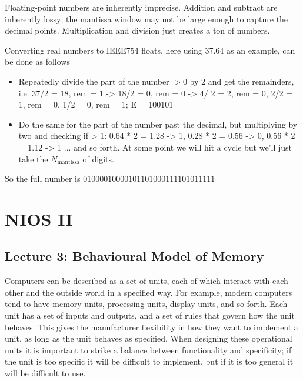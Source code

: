 \documentclass[10pt]{article}
\begin{document}
\begin{definition}
	Floating-point numbers are inherently imprecise. Addition and subtract are inherently lossy; the mantissa window may not be large enough to capture the decimal points. Multiplication and division just creates a ton of numbers.

	Converting real numbers to IEEE754 floats, here using 37.64 as an example, can be done as follows
	\begin{itemize}
		\item Repeatedly divide the part of the number $ >0 $ by $ 2 $ and get the remainders, i.e. 37/2 = 18, rem = 1 -> 18/2 = 0, rem = 0 -> 4/ 2 = 2, rem = 0, 2/2 = 1, rem = 0, 1/2 = 0, rem = 1; E = 100101
		\item Do the same for the part of the number past the decimal, but multiplying by two and checking if > 1: 0.64 * 2 = 1.28 -> 1, 0.28 * 2 = 0.56 -> 0, 0.56 * 2 = 1.12 -> 1 ... and so forth. At some point we will hit a cycle but we'll just take the $ N_{\text{mantissa}} $ of digits.
	\end{itemize}

	So the full number is $  0 1000 0100 0010 1101 0001 1110 1011 111 $
\end{definition}


\section{NIOS II}


\subsection{Lecture 3: Behavioural Model of Memory}


Computers can be described as a set of units, each of which interact with each other and the outside world in a specified way.
For example, modern computers tend to have memory units, processing units, display units, and so forth.
Each unit has a set of inputs and outputs, and a set of rules that govern how the unit behaves.
This gives the manufacturer flexibility in how they want to implement a unit, as long as the unit behaves as specified.
When designing these operational units it is important to strike a balance between functionality and specificity; if the unit is too specific it will be difficult to implement, but if it is too general it will be difficult to use.
\end{document}
